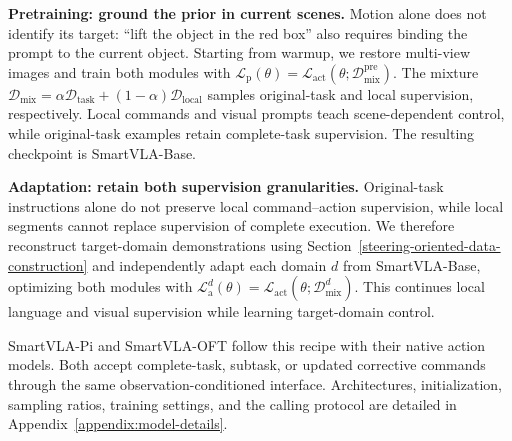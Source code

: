 \textbf{Pretraining: ground the prior in current scenes.} Motion alone does not identify its target:
``lift the object in the red box'' also requires binding the prompt to the current object. Starting
from warmup, we restore multi-view images and train both modules with $\mathcal L_{\mathrm
p}(\theta)=\mathcal L_{\mathrm{act}}(\theta;\mathcal D_{\mathrm{mix}}^{\mathrm{pre}})$. The mixture
$\mathcal D_{\mathrm{mix}}=\alpha\mathcal D_{\mathrm{task}}+(1-\alpha)\mathcal D_{\mathrm{local}}$
samples original-task and local supervision, respectively. Local commands and visual prompts teach
scene-dependent control, while original-task examples retain complete-task supervision. The
resulting checkpoint is SmartVLA-Base.

\textbf{Adaptation: retain both supervision granularities.} Original-task instructions alone do not
preserve local command--action supervision, while local segments cannot replace supervision of
complete execution. We therefore reconstruct target-domain demonstrations using
Section~\ref{steering-oriented-data-construction} and independently adapt each domain $d$ from
SmartVLA-Base, optimizing both modules with $\mathcal L_{\mathrm a}^{d}(\theta)=\mathcal
L_{\mathrm{act}}(\theta;\mathcal D_{\mathrm{mix}}^{d})$. This continues local language and visual
supervision while learning target-domain control.

SmartVLA-Pi and SmartVLA-OFT follow this recipe with their native action models. Both accept
complete-task, subtask, or updated corrective commands through the same observation-conditioned
interface. Architectures, initialization, sampling ratios, training settings, and the calling
protocol are detailed in Appendix~\ref{appendix:model-details}.

